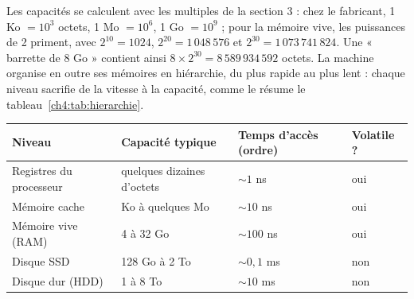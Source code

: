 Les capacités se calculent avec les multiples de la section 3 : chez le fabricant, 1 Ko $= 10^{3}$ octets, 1 Mo $= 10^{6}$, 1 Go $= 10^{9}$ ; pour la mémoire vive, les puissances de 2 priment, avec $2^{10} = 1024$, $2^{20} = 1\,048\,576$ et $2^{30} = 1\,073\,741\,824$. Une « barrette de 8 Go » contient ainsi $8 \times 2^{30} = 8\,589\,934\,592$ octets. La machine organise en outre ses mémoires en hiérarchie, du plus rapide au plus lent : chaque niveau sacrifie de la vitesse à la capacité, comme le résume le tableau~\ref{ch4:tab:hierarchie}.

\begin{center}
\small
\begin{tabular}{L{3.4cm}L{3.8cm}L{4.4cm}L{3.2cm}}
\toprule
{}\textbf{Niveau} & \textbf{Capacité typique} & \textbf{Temps d'accès (ordre)} & \textbf{Volatile ?}\\
\midrule
Registres du processeur & quelques dizaines d'octets & $\sim 1$ ns & oui\\
Mémoire cache & Ko à quelques Mo & $\sim 10$ ns & oui\\
Mémoire vive (RAM) & 4 à 32 Go & $\sim 100$ ns & oui\\
Disque SSD & 128 Go à 2 To & $\sim 0{,}1$ ms & non\\
Disque dur (HDD) & 1 à 8 To & $\sim 10$ ms & non\\
\bottomrule
\end{tabular}
\label{ch4:tab:hierarchie}
\end{center}

\begin{center}
\label{ch4:fig:ram}
\end{center}

